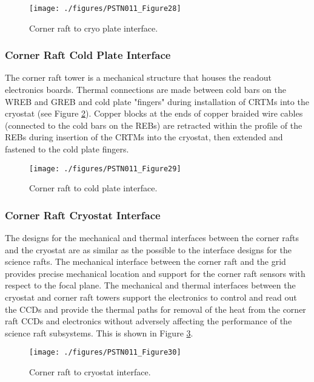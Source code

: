 \begin{figure}[htbp]
\begin{center}
\texttt{[image: ./figures/PSTN011\_Figure28]}
\caption{Corner raft to cryo plate interface.}
\label{fig:Fig28}
\end{center}
\end{figure}

\subsubsection{Corner Raft Cold Plate Interface}

The corner raft tower is a mechanical structure that houses the readout electronics boards. Thermal
connections are made between cold bars on the WREB and GREB and cold plate "fingers" during
installation of CRTMs into the cryostat (see Figure \ref{fig:Fig29}). Copper blocks at the ends of copper braided
wire cables (connected to the cold bars on the REBs) are retracted within the profile of the REBs during
insertion of the CRTMs into the cryostat, then extended and fastened to the cold plate fingers.

\begin{figure}[htbp]
\begin{center}
\texttt{[image: ./figures/PSTN011\_Figure29]}
\caption{Corner raft to cold plate interface.}
\label{fig:Fig29}
\end{center}
\end{figure}

\subsubsection{Corner Raft Cryostat Interface} 

The designs for the mechanical and thermal interfaces between the corner rafts and the cryostat are as
similar as the possible to the interface designs for the science rafts. The mechanical interface between
the corner raft and the grid provides precise mechanical location and support for the corner raft sensors
with respect to the focal plane. The mechanical and thermal interfaces between the cryostat and corner
raft towers support the electronics to control and read out the CCDs and provide the thermal paths for
removal of the heat from the corner raft CCDs and electronics without adversely affecting the
performance of the science raft subsystems. This is shown in Figure \ref{fig:Fig30}.

\begin{figure}[htbp]
\begin{center}
\texttt{[image: ./figures/PSTN011\_Figure30]}
\caption{Corner raft to cryostat interface.}
\label{fig:Fig30}
\end{center}
\end{figure}


